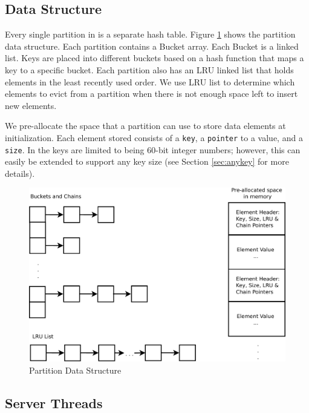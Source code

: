 \subsection{Data Structure}
\label{sec:datastructure}

Every single partition in \cphash{} is a separate hash table. Figure \ref{fig:partition} shows the partition data structure.
Each partition contains a Bucket array. Each Bucket is a linked list. Keys are placed into different buckets based on a hash 
function that maps a key to a specific bucket. Each partition also has an LRU linked list that holds 
elements in the least recently used order. We use LRU list to determine which elements to evict from
a partition when there is not enough space left to insert new elements.

We pre-allocate the space that a partition can use to store data elements at initialization. 
Each element stored consists of a \texttt{key}, a \texttt{pointer} to a value, and a \texttt{size}. 
In \cphash{} the keys are limited to being 60-bit integer numbers; however, this can easily be 
extended to support any key size (see Section \ref{sec:anykey} for more details). 

\begin{figure}[!ht]
  \centering
  \includegraphics[width=\linewidth]{figs/partition.pdf}
  \caption{Partition Data Structure}
  \label{fig:partition}
\end{figure}

\subsection{Server Threads}
\label{sec:serverthreads}

